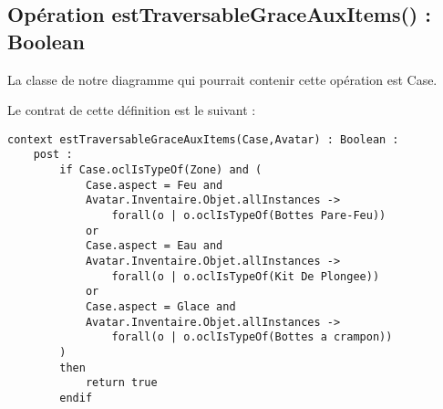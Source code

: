 
\subsection{Opération estTraversableGraceAuxItems() : Boolean}
\label{sec:question17}

La classe de notre diagramme qui pourrait contenir cette opération est Case.

Le contrat de cette définition est le suivant :

\begin{lstlisting}[caption=Contrat \textsc{Ocl} sur l'opération estTraversableGraceAuxItems,captionpos=b,label={lst:operation},language=OCL]
context estTraversableGraceAuxItems(Case,Avatar) : Boolean :
    post :
        if Case.oclIsTypeOf(Zone) and (
            Case.aspect = Feu and
            Avatar.Inventaire.Objet.allInstances ->
                forall(o | o.oclIsTypeOf(Bottes Pare-Feu))
            or
            Case.aspect = Eau and
            Avatar.Inventaire.Objet.allInstances ->
                forall(o | o.oclIsTypeOf(Kit De Plongee))
            or
            Case.aspect = Glace and
            Avatar.Inventaire.Objet.allInstances ->
                forall(o | o.oclIsTypeOf(Bottes a crampon))
        )
        then
            return true
        endif

\end{lstlisting}
